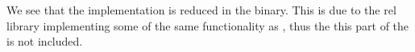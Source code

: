 We see that the  implementation is reduced in the {\rust} binary.
This is due to the \gls{rel} library implementing some of the same functionality as , thus the this part of the  is not included.





